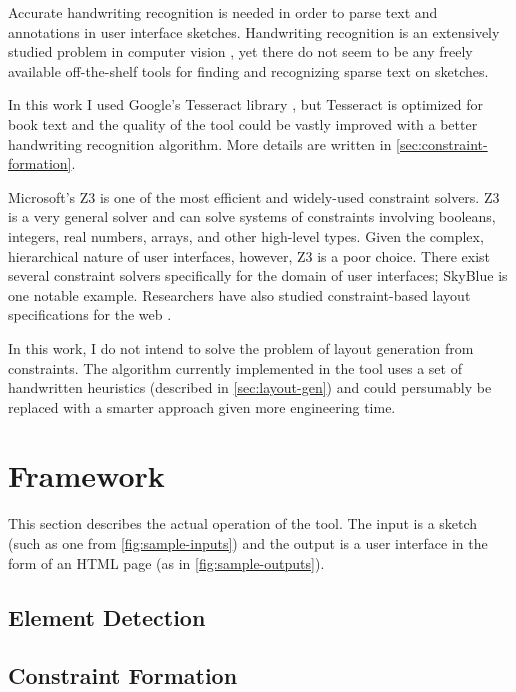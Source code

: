 \documentclass{article}
\begin{document}
Accurate handwriting recognition is needed in order to parse text and
annotations in user interface sketches. Handwriting recognition is an
extensively studied problem in computer vision \cite{HandwritingRecSurvey2000},
yet there do not seem to be any freely available off-the-shelf tools for finding
and recognizing sparse text on sketches.

In this work I used Google's Tesseract library \cite{Tesseract}, but Tesseract
is optimized for book text and the quality of the tool could be vastly improved
with a better handwriting recognition algorithm. More details are written in
\autoref{sec:constraint-formation}.

Microsoft's Z3 \cite{Z32008} is one of the most efficient and widely-used
constraint solvers. Z3 is a very general solver and can solve systems of
constraints involving booleans, integers, real numbers, arrays, and other
high-level types. Given the complex, hierarchical nature of user interfaces,
however, Z3 is a poor choice. There exist several constraint solvers
specifically for the domain of user interfaces; SkyBlue \cite{SkyBlue1994} is
one notable example. Researchers have also studied constraint-based layout
specifications for the web \cite{ConstraintsForTheWeb1997}.

In this work, I do not intend to solve the problem of layout generation from
constraints. The algorithm currently implemented in the tool uses a set of
handwritten heuristics (described in \autoref{sec:layout-gen}) and could
persumably be replaced with a smarter approach given more engineering time.

\section{Framework}

This section describes the actual operation of the tool. The input is a sketch
(such as one from \autoref{fig:sample-inputs}) and the output is a user
interface in the form of an HTML page (as in \autoref{fig:sample-outputs}).

\subsection{Element Detection}
\label{sec:element-detection}

\subsection{Constraint Formation}
\label{sec:constraint-formation}
\end{document}
